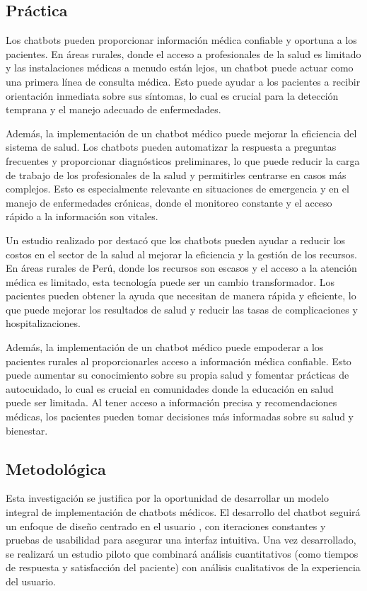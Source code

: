 \subsection{Práctica}
Los chatbots pueden proporcionar información médica confiable y oportuna a los pacientes. En áreas rurales, donde el acceso a profesionales de la salud es limitado y las instalaciones médicas a menudo están lejos, un chatbot puede actuar como una primera línea de consulta médica. Esto puede ayudar a los pacientes a recibir orientación inmediata sobre sus síntomas, lo cual es crucial para la detección temprana y el manejo adecuado de enfermedades.

Además, la implementación de un chatbot médico puede mejorar la eficiencia del sistema de salud. Los chatbots pueden automatizar la respuesta a preguntas frecuentes y proporcionar diagnósticos preliminares, lo que puede reducir la carga de trabajo de los profesionales de la salud y permitirles centrarse en casos más complejos. Esto es especialmente relevante en situaciones de emergencia y en el manejo de enfermedades crónicas, donde el monitoreo constante y el acceso rápido a la información son vitales.

Un estudio realizado por \cite{Pricewaterhouse} destacó que los chatbots pueden ayudar a reducir los costos en el sector de la salud al mejorar la eficiencia y la gestión de los recursos. En áreas rurales de Perú, donde los recursos son escasos y el acceso a la atención médica es limitado, esta tecnología puede ser un cambio transformador. Los pacientes pueden obtener la ayuda que necesitan de manera rápida y eficiente, lo que puede mejorar los resultados de salud y reducir las tasas de complicaciones y hospitalizaciones.

Además, la implementación de un chatbot médico puede empoderar a los pacientes rurales al proporcionarles acceso a información médica confiable. Esto puede aumentar su conocimiento sobre su propia salud y fomentar prácticas de autocuidado, lo cual es crucial en comunidades donde la educación en salud puede ser limitada. Al tener acceso a información precisa y recomendaciones médicas, los pacientes pueden tomar decisiones más informadas sobre su salud y bienestar.

\subsection{Metodológica}

Esta investigación se justifica por la oportunidad de desarrollar un modelo integral de implementación de chatbots médicos. El desarrollo del chatbot seguirá un enfoque de diseño centrado en el usuario \cite{Norman1986}, con iteraciones constantes y pruebas de usabilidad para asegurar una interfaz intuitiva. Una vez desarrollado, se realizará un estudio piloto que combinará análisis cuantitativos (como tiempos de respuesta y satisfacción del paciente) con análisis cualitativos de la experiencia del usuario.

